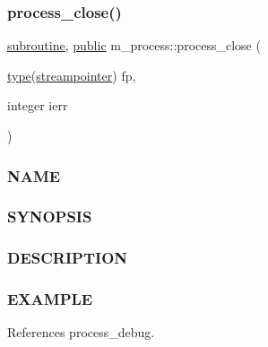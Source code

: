 \subsubsection{\texorpdfstring{process\+\_\+close()}{process\_close()}}
{\footnotesize\ttfamily \hyperlink{M__stopwatch_83_8txt_acfbcff50169d691ff02d4a123ed70482}{subroutine}, \hyperlink{M__stopwatch_83_8txt_a2f74811300c361e53b430611a7d1769f}{public} m\+\_\+process\+::process\+\_\+close (\begin{DoxyParamCaption}\item[{\hyperlink{stop__watch_83_8txt_a70f0ead91c32e25323c03265aa302c1c}{type}(\hyperlink{structm__process_1_1streampointer}{streampointer})}]{fp,  }\item[{integer}]{ierr }\end{DoxyParamCaption})}



\subsubsection*{N\+A\+ME}

\subsubsection*{S\+Y\+N\+O\+P\+S\+IS}

\subsubsection*{D\+E\+S\+C\+R\+I\+P\+T\+I\+ON}

\subsubsection*{E\+X\+A\+M\+P\+LE}

References process\+\_\+debug.

\mbox{\label{namespacem__process_a3c0f543a9ceff2671041d73660f60a59}} 
